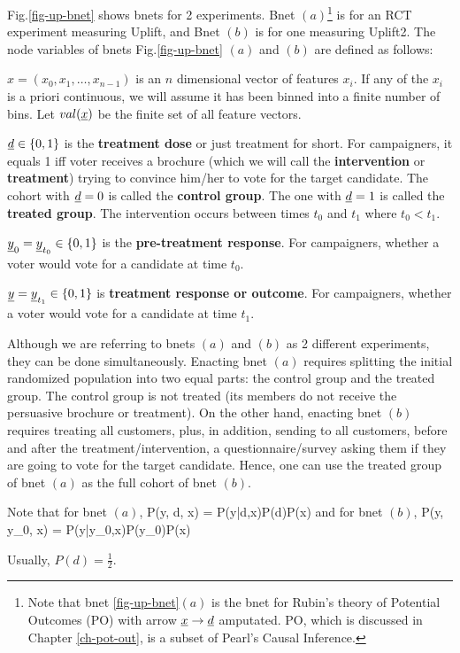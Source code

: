 Fig.\ref{fig-up-bnet} shows bnets for 2 experiments. Bnet $(a)$\footnote{
Note that bnet \ref{fig-up-bnet}$(a)$ 
is the bnet for Rubin's theory of 
Potential Outcomes (PO)
with arrow $\rvx\rarrow \rvd$ amputated.
PO, which is
discussed in Chapter \ref{ch-pot-out},
 is a subset
of Pearl's Causal Inference.
} is for an RCT experiment measuring 
Uplift, and Bnet $(b)$ is for one measuring Uplift2. 
The node variables of bnets Fig.\ref{fig-up-bnet}
$(a)$ and $(b)$
are defined as follows:

$x=(x_0, x_1,\dots, x_{n-1})$ is an $n$ dimensional 
vector of features $x_i$. If any of the $x_i$
is a priori continuous, we will
assume it has  been binned into
a finite number of bins.
Let $val(\rvx)$ be the finite set of  all feature vectors.

$\rvd\in\bool$ is the {\bf treatment dose} or just treatment for short. For campaigners, it equals 1 iff voter receives
a brochure (which
we will call the {\bf intervention}
or {\bf treatment}) trying to convince him/her to vote 
for the target  candidate. The cohort with $\rvd=0$ is called the {\bf control group}. The one with $\rvd=1$ is called the {\bf treated group}.
The intervention occurs between times $t_0$ and $t_1$
where $t_0<t_1$.

$\rvy_0=\rvy_{t_0}\in \bool$ is the 
{\bf pre-treatment response}. For campaigners, whether a voter would
vote for a candidate at time $t_0$.

$\rvy=\rvy_{t_1}\in \bool$
is {\bf treatment response or outcome}. For campaigners, whether a voter would
vote for a candidate at time $t_1$. 

Although we are referring to bnets $(a)$
and $(b)$ as 2 different experiments, they can be done
simultaneously. Enacting
bnet $(a)$ requires splitting the initial 
randomized population into two equal parts:
the control group and the treated group.
The control group is not treated (its members do
not receive the persuasive brochure or treatment). On the other hand, enacting bnet $(b)$ requires
treating all customers, plus, in addition,
sending to 
all customers, before
and after the treatment/intervention, a questionnaire/survey  
asking them if they are going to
vote for the target candidate.
Hence, one can use the treated group of
bnet $(a)$ as the full cohort of bnet $(b)$.

Note that for bnet $(a)$, 
\beq
P(y, d, x) = P(y|d,x)P(d)P(x)
\eeq
and for bnet $(b)$,
\beq
P(y, y_0, x) = P(y|y_0,x)P(y_0)P(x)
\eeq

Usually, $P(d) = \frac{1}{2}$.

